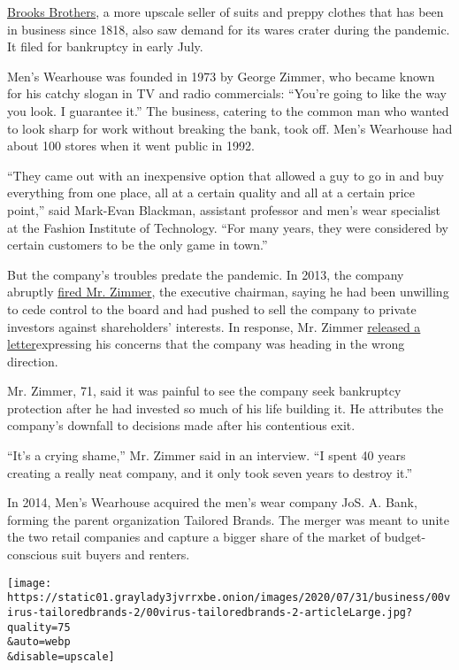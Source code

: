 \href{https://www.nytimes3xbfgragh.onion/2020/07/08/business/brooks-brothers-chapter-11-bankruptcy.html}{Brooks
Brothers}, a more upscale seller of suits and preppy clothes that has
been in business since 1818, also saw demand for its wares crater during
the pandemic. It filed for bankruptcy in early July.

Men's Wearhouse was founded in 1973 by George Zimmer, who became known
for his catchy slogan in TV and radio commercials: ``You're going to
like the way you look. I guarantee it.'' The business, catering to the
common man who wanted to look sharp for work without breaking the bank,
took off. Men's Wearhouse had about 100 stores when it went public in
1992.

``They came out with an inexpensive option that allowed a guy to go in
and buy everything from one place, all at a certain quality and all at a
certain price point,'' said Mark-Evan Blackman, assistant professor and
men's wear specialist at the Fashion Institute of Technology. ``For many
years, they were considered by certain customers to be the only game in
town.''

But the company's troubles predate the pandemic. In 2013, the company
abruptly
\href{https://www.nytimes3xbfgragh.onion/2013/06/20/business/dumping-the-face-and-founder-of-mens-wearhouse.html}{fired
Mr. Zimmer}, the executive chairman, saying he had been unwilling to
cede control to the board and had pushed to sell the company to private
investors against shareholders' interests. In response, Mr. Zimmer
\href{https://blogs.wsj.com/corporate-intelligence/2013/06/26/an-open-letter-from-the-ousted-mens-wearhouse-boss/}{released
a letter}expressing his concerns that the company was heading in the
wrong direction.

Mr. Zimmer, 71, said it was painful to see the company seek bankruptcy
protection after he had invested so much of his life building it. He
attributes the company's downfall to decisions made after his
contentious exit.

``It's a crying shame,'' Mr. Zimmer said in an interview. ``I spent 40
years creating a really neat company, and it only took seven years to
destroy it.''

In 2014, Men's Wearhouse acquired the men's wear company JoS. A. Bank,
forming the parent organization Tailored Brands. The merger was meant to
unite the two retail companies and capture a bigger share of the market
of budget-conscious suit buyers and renters.

\texttt{[image: https://static01.graylady3jvrrxbe.onion/images/2020/07/31/business/00virus-tailoredbrands-2/00virus-tailoredbrands-2-articleLarge.jpg?quality=75\\\&auto=webp\\\&disable=upscale]}

